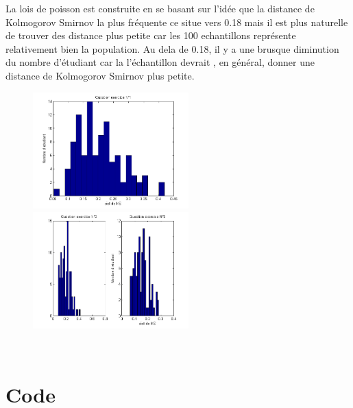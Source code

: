 \documentclass[10pt,a4paper]{article}
\begin{document}
La lois de poisson est construite en se basant sur l'idée que la distance de Kolmogorov Smirnov la plus fréquente ce situe vers 0.18 mais il est plus naturelle de trouver des distance plus petite car les 100 echantillons représente relativement bien la population. Au dela de 0.18, il y a une brusque diminution du nombre d'étudiant car la l'échantillon devrait , en général, donner une distance de Kolmogorov Smirnov plus petite.
\begin{figure}[H]
\centering
\includegraphics[width=6cm]{2biv_graphe.png} \hfill
\includegraphics[width=6cm]{2bv_graphe.png}
\end{figure}
\ \\

\newpage

\section*{Code}


\newpage

\newpage

\newpage

\newpage

\newpage


\newpage

\newpage


\newpage


\newpage

\end{document}
